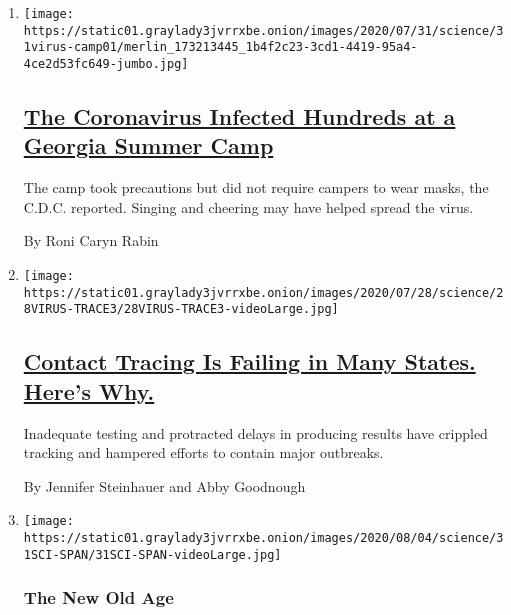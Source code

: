 \begin{enumerate}
\def\labelenumi{\arabic{enumi}.}
\item
  \texttt{[image: https://static01.graylady3jvrrxbe.onion/images/2020/07/31/science/31virus-camp01/merlin\_173213445\_1b4f2c23-3cd1-4419-95a4-4ce2d53fc649-jumbo.jpg]}

  \hypertarget{the-coronavirus-infected-hundreds-at-a-georgia-summer-camp}{%
  \subsection{\texorpdfstring{\href{/2020/07/31/health/coronavirus-children-camp.html}{The
  Coronavirus Infected Hundreds at a Georgia Summer
  Camp}}{The Coronavirus Infected Hundreds at a Georgia Summer Camp}}\label{the-coronavirus-infected-hundreds-at-a-georgia-summer-camp}}

  The camp took precautions but did not require campers to wear masks,
  the C.D.C. reported. Singing and cheering may have helped spread the
  virus.

  By Roni Caryn Rabin
\item
  \texttt{[image: https://static01.graylady3jvrrxbe.onion/images/2020/07/28/science/28VIRUS-TRACE3/28VIRUS-TRACE3-videoLarge.jpg]}

  \hypertarget{contact-tracing-is-failing-in-many-states-heres-why}{%
  \subsection{\texorpdfstring{\href{/2020/07/31/health/covid-contact-tracing-tests.html}{Contact
  Tracing Is Failing in Many States. Here's
  Why.}}{Contact Tracing Is Failing in Many States. Here's Why.}}\label{contact-tracing-is-failing-in-many-states-heres-why}}

  Inadequate testing and protracted delays in producing results have
  crippled tracking and hampered efforts to contain major outbreaks.

  By Jennifer Steinhauer and Abby Goodnough
\item
  \texttt{[image: https://static01.graylady3jvrrxbe.onion/images/2020/08/04/science/31SCI-SPAN/31SCI-SPAN-videoLarge.jpg]}

  \hypertarget{the-new-old-age}{%
  \subsubsection{The New Old Age}\label{the-new-old-age}}

  \hypertarget{should-youth-come-first-in-coronavirus-care}{%
}
\end{enumerate}
